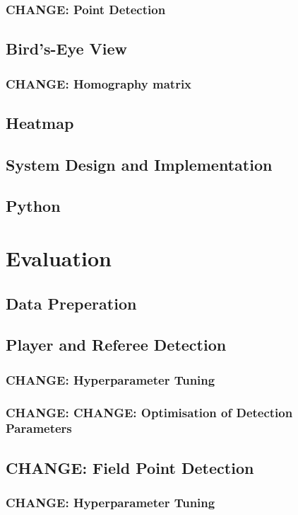 \documentclass[12pt, letterpaper]{article}
\begin{document}
\subsubsection{\textbf{CHANGE}: Point Detection}
\subsection{Bird’s-Eye View}
\subsubsection{\textbf{CHANGE}: Homography matrix}
\subsection{Heatmap}
\subsection{System Design and Implementation}
\subsection{Python}
\newpage

\section{Evaluation}

\subsection{Data Preperation}
\subsection{Player and Referee Detection}
\subsubsection{\textbf{CHANGE}: Hyperparameter Tuning}
\subsubsection{\textbf{CHANGE}: \textbf{CHANGE}: Optimisation of Detection Parameters}
\subsection{\textbf{CHANGE}: Field Point Detection}
\subsubsection{\textbf{CHANGE}: Hyperparameter Tuning}
\end{document}
